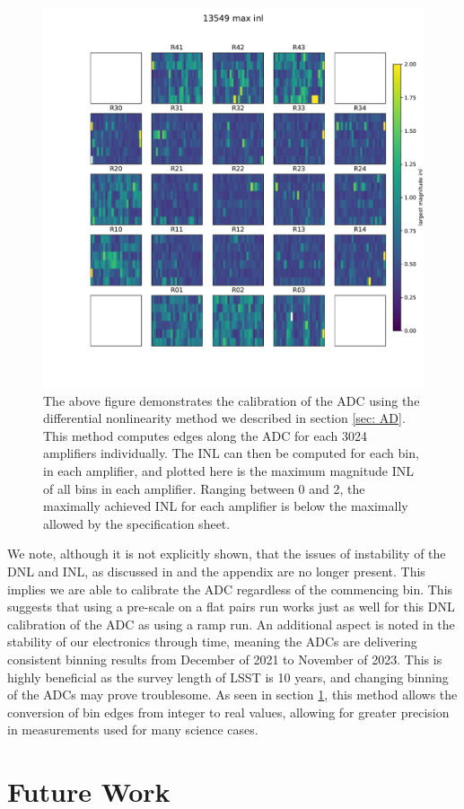 \documentclass[11pt, letterpaper]{article}
\begin{document}
\begin{figure}
    \centering
    \includegraphics[width=0.5\linewidth]{13549maxinl.pdf}
    \caption{The above figure demonstrates the calibration of the ADC using the differential nonlinearity method we described in section \ref{sec: AD}. This method computes edges along the ADC for each 3024 amplifiers individually. The INL can then be computed for each bin, in each amplifier, and plotted here is the maximum magnitude INL of all bins in each amplifier. Ranging between 0 and 2, the maximally achieved INL for each amplifier is below the maximally allowed by the specification sheet.}
    \label{fig:focalplaneINL}
\end{figure}



\indent

We note, although it is not explicitly shown, that the issues of instability of the DNL and INL, as discussed in and the appendix are no longer present. 
This implies we are able to calibrate the ADC regardless of the commencing bin. 
This suggests that using a pre-scale on a flat pairs run works just as well for this DNL calibration of the ADC as using a ramp run. 
An additional aspect is noted in the stability of our electronics through time, meaning the ADCs are delivering consistent binning results from December of 2021 to November of 2023. 
This is highly beneficial as the survey length of LSST is 10 years, and changing binning of the ADCs may prove troublesome. 
As seen in section \ref{sec:Future}, this method allows the conversion of bin edges from integer to real values, allowing for greater precision in measurements used for many science cases. 

\section{Future Work}
\label{sec:Future}
\indent
\end{document}
